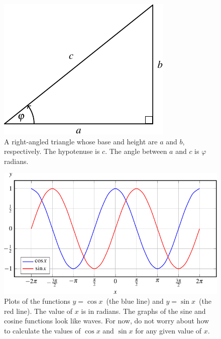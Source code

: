 \documentclass[a4paper,oneside,12pt]{article}
\begin{document}
\begin{figure}[!htbp]
\centering
\includegraphics[scale=1]{image/04/right-triangle.pdf}
\caption{%
  A right-angled triangle whose base and height are $a$ and $b$,
  respectively.  The hypotenuse is $c$.  The angle between $a$ and $c$
  is $\varphi$ radians.
}
\label{fig:right_angled_triangle_angle_phi}
\end{figure}

\begin{figure}[!htbp]
\centering
\includegraphics[scale=1]{image/04/cos-sin.pdf}
\caption{%
  Plots of the functions $y = \cos x$~(the blue line) and
  $y = \sin x$~(the red line).  The value of $x$ is in radians.  The
  graphs of the sine and cosine functions look like waves.  For now,
  do not worry about how to calculate the values of $\cos x$ and
  $\sin x$ for any given value of $x$.
}
\label{fig:cosine_sine}
\end{figure}
\end{document}
